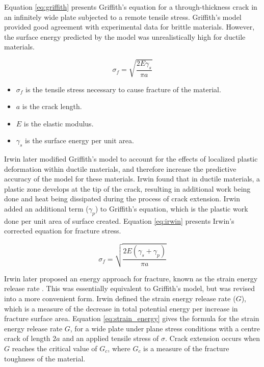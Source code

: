 Equation \ref{eq:griffith} presents Griffith's equation for a through-thickness crack in an infinitely wide plate subjected to a remote tensile stress. Griffith's model provided good agreement with experimental data for brittle materials. However, the surface energy predicted by the model was unrealistically high for ductile materials.

\begin{equation}
	\sigma_f = \sqrt{\frac{2 E \gamma_s}{\pi a}}\label{eq:griffith}
\end{equation}

\begin{itemize}
	\item $\sigma_f$ is the tensile stress necessary to cause fracture of the material.
	\item $a$ is the crack length.
	\item $E$ is the elastic modulus.
	\item $\gamma_s$ is the surface energy per unit area.
\end{itemize}

\newpage
Irwin later modified Griffith's model to account for the effects of localized plastic deformation within ductile materials, and therefore increase the predictive accuracy of the model for these materials. Irwin found that in ductile materials, a plastic zone develops at the tip of the crack, resulting in additional work being done and heat being dissipated during the process of crack extension. Irwin added an additional term ($\gamma_p$) to Griffith's equation, which is the plastic work done per unit area of surface created. Equation \ref{eq:irwin} presents Irwin's corrected equation for fracture stress.

\begin{equation}
	\sigma_f = \sqrt{\frac{2 E (\gamma_s + \gamma_p)}{\pi a}}\label{eq:irwin}
\end{equation}
 
Irwin later proposed an energy approach for fracture, known as the strain energy release rate \cite{irwin_onset_1956}.  This was essentially equivalent to Griffith's model, but was revised into a more convenient form. Irwin defined the strain energy release rate ($G$), which is a measure of the decrease in total potential energy per increase in fracture surface area. Equation \ref{eq:strain_energy} gives the formula for the strain energy release rate $G$, for a wide plate under plane stress conditions with a centre crack of length $2a$ and an applied tensile stress of $\sigma$. Crack extension occurs when $G$ reaches the critical value of $G_c$, where $G_c$ is a measure of the fracture toughness of the material.

